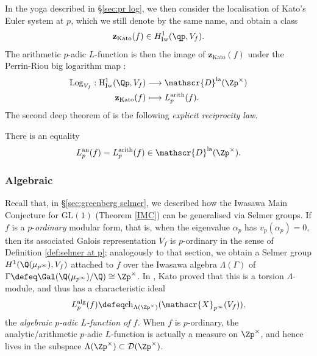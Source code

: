 \documentclass[a4paper,10pt, english, reqno]{smfart}
\newcommand{\GL}{\mathrm{GL}}
\newcommand{\sX}{\mathscr{X}}
\newcommand{\cD}{\mathcal{D}}
\numberwithin{equation}{section}
\begin{document}
In the yoga described in \S\ref{sec:pr log}, we then consider the localisation of Kato's Euler system at $p$, which we still denote by the same name, and obtain a class
\[ \mathbf{z}_{\rm Kato}(f) \in H^1_{\rm Iw}(\qp, V_f). \]
The arithmetic $p$-adic $L$-function is then the image of $\mathbf{z}_{\mathrm{Kato}}(f)$ under the Perrin-Riou big logarithm map :
\begin{align*}
	\mathrm{Log}_{V_f} : \mathrm{H}^1_{\mathrm{Iw}}(\Qp, V_f) &\longrightarrow \mathscr{D}^{\rm la}(\Zp^\times)\\
	\mathbf{z}_{\mathrm{Kato}}(f) &\longmapsto L_p^{\mathrm{arith}}(f).
\end{align*}
The second deep theorem of \cite{Kat04} is the following \emph{explicit reciprocity law}.

\begin{theorem}
	There is an equality 
	\[
	L_p^{\mathrm{an}}(f) = L_p^{\mathrm{arith}}(f) \in \mathscr{D}^{\rm la}(\Zp^\times).
	\]
\end{theorem}




\subsubsection{Algebraic}

Recall that, in \S\ref{sec:greenberg selmer}, we described how the Iwasawa Main Conjecture for $\GL(1)$ (Theorem \ref{IMC}) can be generalised via Selmer groups. If $f$ is a $p$-\emph{ordinary} modular form, that is, when the eigenvalue $\alpha_p$ has $v_p(\alpha_p) = 0$, then its associated Galois representation $V_f$ is $p$-ordinary in the sense of Definition \ref{def:selmer at p}; analogously to that section, we obtain a Selmer group $H^1(\Q(\mu_{p^\infty}),V_f)$ attached to $f$ over the Iwasawa algebra $\Lambda(\Gamma)$ of $\Gamma \defeq \Gal(\Q(\mu_{p^\infty})/\Q) \cong \Zp^\times$. In \cite{Kat04}, Kato proved that this is a torsion $\Lambda$-module, and thus has a characteristic ideal 
\[
L_p^{\mathrm{alg}}(f) \defeq \mathrm{ch}_{\Lambda(\Zp^\times)}(\sX_{p^\infty}(V_f)),
\]
the \emph{algebraic $p$-adic $L$-function of $f$.} When $f$ is $p$-ordinary, the analytic/arithmetic $p$-adic $L$-function is actually a measure on $\Zp^\times$, and hence lives in the subspace $\Lambda(\Zp^\times) \subset \cD(\Zp^\times)$. 
\end{document}
